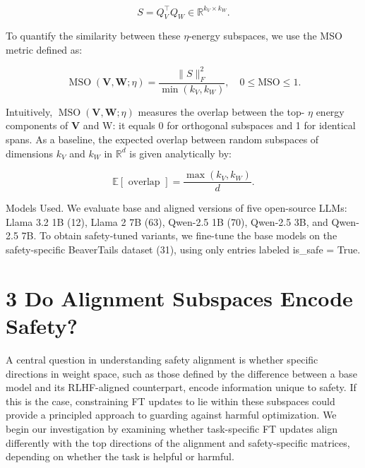 \documentclass[10pt]{article}
\begin{document}
\begin{equation*}
S=Q_{V}^{\top} Q_{W} \in \mathbb{R}^{k_{V} \times k_{W}} . \tag{9}
\end{equation*}


To quantify the similarity between these $\eta$-energy subspaces, we use the MSO metric defined as:


\begin{equation*}
\operatorname{MSO}(\mathbf{V}, \mathbf{W} ; \eta)=\frac{\|S\|_{F}^{2}}{\min \left(k_{V}, k_{W}\right)}, \quad 0 \leq \mathrm{MSO} \leq 1 . \tag{10}
\end{equation*}


Intuitively, $\operatorname{MSO}(\mathbf{V}, \mathbf{W} ; \eta)$ measures the overlap between the top- $\eta$ energy components of $\mathbf{V}$ and W: it equals 0 for orthogonal subspaces and 1 for identical spans. As a baseline, the expected overlap between random subspaces of dimensions $k_{V}$ and $k_{W}$ in $\mathbb{R}^{d}$ is given analytically by:


\begin{equation*}
\mathbb{E}[\text { overlap }]=\frac{\max \left(k_{V}, k_{W}\right)}{d} . \tag{11}
\end{equation*}


Models Used. We evaluate base and aligned versions of five open-source LLMs: Llama 3.2 1B (12), Llama 2 7B (63), Qwen-2.5 1B (70), Qwen-2.5 3B, and Qwen-2.5 7B. To obtain safety-tuned variants, we fine-tune the base models on the safety-specific BeaverTails dataset (31), using only entries labeled is\_safe = True.

\section*{3 Do Alignment Subspaces Encode Safety?}
A central question in understanding safety alignment is whether specific directions in weight space, such as those defined by the difference between a base model and its RLHF-aligned counterpart, encode information unique to safety. If this is the case, constraining FT updates to lie within these subspaces could provide a principled approach to guarding against harmful optimization. We begin our investigation by examining whether task-specific FT updates align differently with the top directions of the alignment and safety-specific matrices, depending on whether the task is helpful or harmful.
\end{document}
